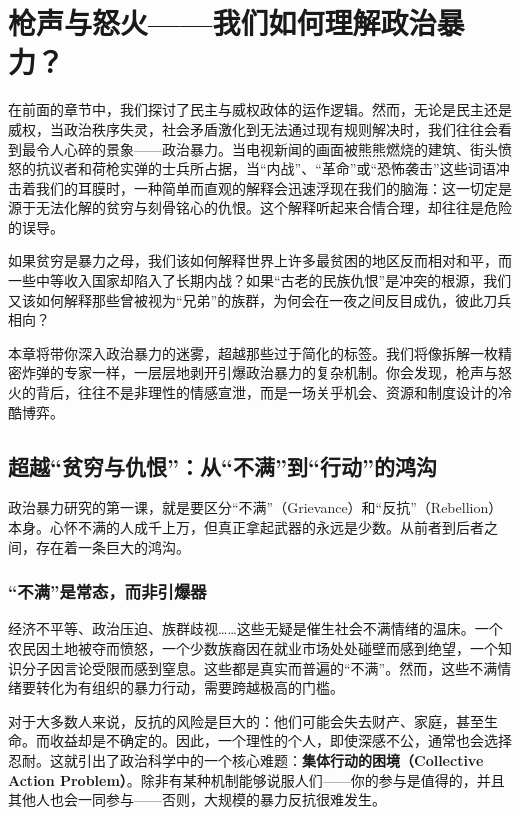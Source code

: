 \documentclass[a5paper, 11pt, openany]{ctexbook}
\begin{document}
\chapter{枪声与怒火——我们如何理解政治暴力？}

在前面的章节中，我们探讨了民主与威权政体的运作逻辑。然而，无论是民主还是威权，当政治秩序失灵，社会矛盾激化到无法通过现有规则解决时，我们往往会看到最令人心碎的景象——政治暴力。当电视新闻的画面被熊熊燃烧的建筑、街头愤怒的抗议者和荷枪实弹的士兵所占据，当“内战”、“革命”或“恐怖袭击”这些词语冲击着我们的耳膜时，一种简单而直观的解释会迅速浮现在我们的脑海：这一切定是源于无法化解的贫穷与刻骨铭心的仇恨。这个解释听起来合情合理，却往往是危险的误导。

如果贫穷是暴力之母，我们该如何解释世界上许多最贫困的地区反而相对和平，而一些中等收入国家却陷入了长期内战？如果“古老的民族仇恨”是冲突的根源，我们又该如何解释那些曾被视为“兄弟”的族群，为何会在一夜之间反目成仇，彼此刀兵相向？

本章将带你深入政治暴力的迷雾，超越那些过于简化的标签。我们将像拆解一枚精密炸弹的专家一样，一层层地剥开引爆政治暴力的复杂机制。你会发现，枪声与怒火的背后，往往不是非理性的情感宣泄，而是一场关乎机会、资源和制度设计的冷酷博弈。

\section{超越“贫穷与仇恨”：从“不满”到“行动”的鸿沟}

政治暴力研究的第一课，就是要区分“不满”（Grievance）和“反抗”（Rebellion）本身。心怀不满的人成千上万，但真正拿起武器的永远是少数。从前者到后者之间，存在着一条巨大的鸿沟。

\subsection{“不满”是常态，而非引爆器}

经济不平等、政治压迫、族群歧视……这些无疑是催生社会不满情绪的温床。一个农民因土地被夺而愤怒，一个少数族裔因在就业市场处处碰壁而感到绝望，一个知识分子因言论受限而感到窒息。这些都是真实而普遍的“不满”。然而，这些不满情绪要转化为有组织的暴力行动，需要跨越极高的门槛。

对于大多数人来说，反抗的风险是巨大的：他们可能会失去财产、家庭，甚至生命。而收益却是不确定的。因此，一个理性的个人，即使深感不公，通常也会选择忍耐。这就引出了政治科学中的一个核心难题：\textbf{集体行动的困境（Collective Action Problem）}。除非有某种机制能够说服人们——你的参与是值得的，并且其他人也会一同参与——否则，大规模的暴力反抗很难发生。
\end{document}
